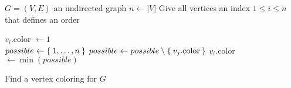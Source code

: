 \documentclass{article}
\begin{document}
\begin{preview}
    \begin{algorithm}[H]
        \begin{algorithmic}
            \Require $G = (V, E)$ an undirected graph
            \State $n \gets |V|$
            \State Give all vertices an index $1 \leq i \leq n$ that defines an order
            
                \State $v_i$.color $\gets 1$
            \EndFor
            \\
                \State $possible \gets \Set{1, \dots, n}$
                        \State $possible \gets possible \setminus \Set{v_j.\text{color}}$
                    \EndIf
                \EndFor
                \State $v_i$.color $\gets \min(possible)$
            \EndFor
        \end{algorithmic}
    \caption{Find a vertex coloring for $G$}
    \label{alg:vertexColoring}
    \end{algorithm}
\end{preview}
\end{document}
